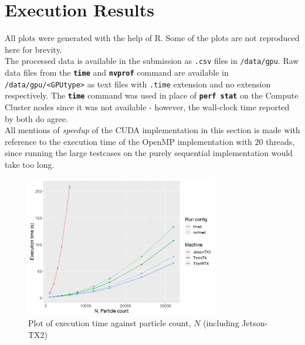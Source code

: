 \documentclass[12pt]{article}
\newcommand{\bt}[1]{\texttt{\textbf{#1}}}
\begin{document}
\pagebreak

\section{Execution Results}

All plots were generated with the help of R. Some of the plots are not reproduced here for brevity.\\

The processed data is available in the submission as \texttt{.csv} files in \texttt{/data/gpu}. Raw data files from the \bt{time} and \bt{nvprof} command are available in \texttt{/data/gpu/<GPUtype>} as text files with \texttt{.time} extension and no extension respectively. The \bt{time} command was used in place of \bt{perf stat} on the Compute Cluster nodes since it was not available - however, the wall-clock time reported by both do agree.\\

All mentions of \textit{speedup} of the CUDA implementation in this section is made with reference to the execution time of the OpenMP implementation with $20$ threads, since running the large testcases on the purely sequential implementation would take too long.\\

\begin{figure}[H]
    \centering
    \includegraphics[width=0.75\textwidth]{gpu-varyN-withJetson}
    \caption{Plot of execution time against particle count, $N$ (including Jetson-TX2)}
    \label{fig:gpu-varyN-withJetson}
\end{figure}
\end{document}
